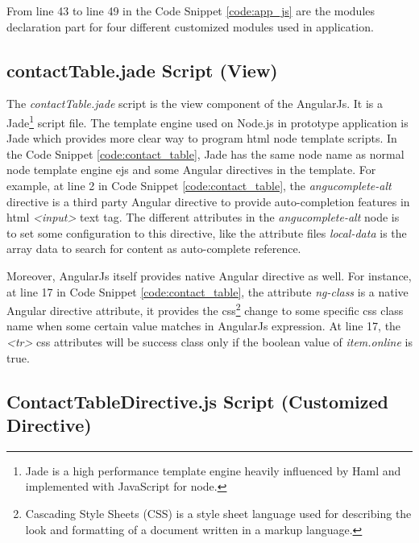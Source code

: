 \par From line 43 to line 49 in the Code Snippet \ref{code:app_js} are the modules declaration part for four different customized modules used in application. 

\subsection{contactTable.jade Script (View)}

\par The \textit{contactTable.jade} script is the view component of the AngularJs. It is a Jade\footnote{Jade is a high performance template engine heavily influenced by Haml and implemented with JavaScript for node.\cite{github:jade}} script file. The template engine used on Node.js in prototype application is Jade which provides more clear way to program \gls{html} node template scripts. In the Code Snippet \ref{code:contact_table}, Jade has the same node name as normal node template engine \gls{ejs} and some Angular directives in the template. For example, at line 2 in Code Snippet \ref{code:contact_table}, the \textit{angucomplete-alt} directive is a third party Angular directive to provide auto-completion features in \gls{html} \textit{<input>} text tag. The different attributes in the \textit{angucomplete-alt} node is to set some configuration to this directive, like the attribute files \textit{local-data} is the array data to search for content as auto-complete reference.

\par Moreover, AngularJs itself provides native Angular directive as well. For instance, at line 17 in Code Snippet \ref{code:contact_table}, the attribute \textit{ng-class} is a native Angular directive attribute, it provides the \gls{css}\footnote{Cascading Style Sheets (CSS) is a style sheet language used for describing the look and formatting of a document written in a markup language.\cite{wiki:css}} change to some specific \gls{css} class name when some certain value matches in AngularJs expression. At line 17, the \textit{<tr>} \gls{css} attributes will be success class only if the boolean value of \textit{item.online} is true.

\subsection{ContactTableDirective.js Script (Customized Directive)}

\par

